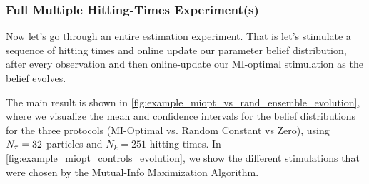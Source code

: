 \documentclass{article}
\begin{document}
\subsubsection{Full Multiple Hitting-Times Experiment(s)}
Now let's go through an entire estimation experiment. That is let's stimulate a
sequence of hitting times and online update our parameter belief distribution,
after every observation and then online-update our MI-optimal stimulation as the
belief evolves.

The main result is shown in \cref{fig:example_miopt_vs_rand_ensemble_evolution},
where we visualize the mean and confidence intervals for the belief
distributions for the three protocols (MI-Optimal vs. Random Constant vs Zero),
using $N_{\tau} = 32$ particles and $N_k=251$ hitting times. In
\cref{fig:example_miopt_controls_evolution}, we show the different stimulations
that were chosen by the Mutual-Info Maximization Algorithm.
 
\end{document}
